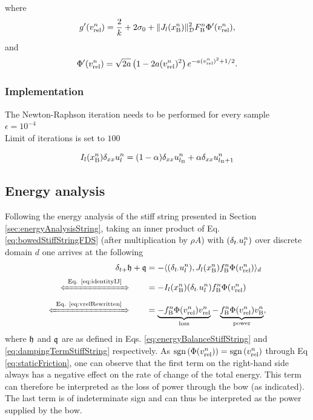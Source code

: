 where
\begin{equation}
    g'(v_\text{rel}^n) = \frac{2}{k} + 2\sigma_{0} + \lVert J_l(x_{\text{B}}^n)\rVert^2_{\mathcal{D}} F_{\text{B}}^n\Phi'(v_\text{rel}^n),
\end{equation}
and 
\begin{equation*}
    \begin{aligned}
        \Phi'(\vrel^n) %
        = \sqrt{2a}\left(1 - 2a(\vrel^n)^2\right)e^{-a(\vrel^n)^2+1/2}.
    \end{aligned}
\end{equation*}
\subsubsection{Implementation}
The Newton-Raphson iteration needs to be performed for every sample\\

$\epsilon = 10^{-4}$\\
Limit of iterations is set to $100$

\begin{equation}
    I_l(x_{\text{B}}^n) \delta_{xx} u_l^n = (1-\alpha)\delta_{xx} u_{l_{\text{B}}}^n + \alpha \delta_{xx} u_{l_{\text{B}}+1}^n
\end{equation}

\subsection{Energy analysis}
Following the energy analysis of the stiff string presented in Section \eqref{sec:energyAnalysisString}, taking an inner product of Eq. \eqref{eq:bowedStiffStringFDS} (after multiplication by $\rho A$) with $(\delta_{t\cdot} u_l^n)$ over discrete domain $d$ one arrives at the following 
\begin{align*}
    \dtp \h + \q &=  - \langle (\dtd \uln), J_l(x_\Btxt^n)f_\Btxt^n\Phi(\vrel^n) \rangle_d\\[-5pt]
    \xLeftrightarrow{\mystrut\ \text{Eq. \eqref{eq:identityIJ}}\ }\qquad &= -I_l(x_\Btxt^n)(\dtd \uln) f_\Btxt^n \Phi(\vrel^n) \\[-5pt]
    \xLeftrightarrow{\mystrut\ \text{Eq. \eqref{eq:vrelRewritten}}\ } \qquad &= \underbrace{-f_\Btxt^n \Phi(\vrel^n) \vrel^n}_{\text{loss}} - \underbrace{f_\Btxt^n \Phi(\vrel^n)v_\Btxt^n}_{\text{power}},
\end{align*}
where $\mathfrak{h}$ and $\mathfrak{q}$ are as defined in Eqs. \eqref{eq:energyBalanceStiffString} and \eqref{eq:dampingTermStiffString} respectively. As $\text{sgn}\left(\Phi(v_\text{rel}^n)\right) = \text{sgn}\left(v_\text{rel}^n\right)$ through Eq \eqref{eq:staticFriction}, one can observe that the first term on the right-hand side always has a negative effect on the rate of change of the total energy. This term can therefore be interpreted as the loss of power through the bow (as indicated). The last term is of indeterminate sign and can thus be interpreted as the power supplied by the bow. 

